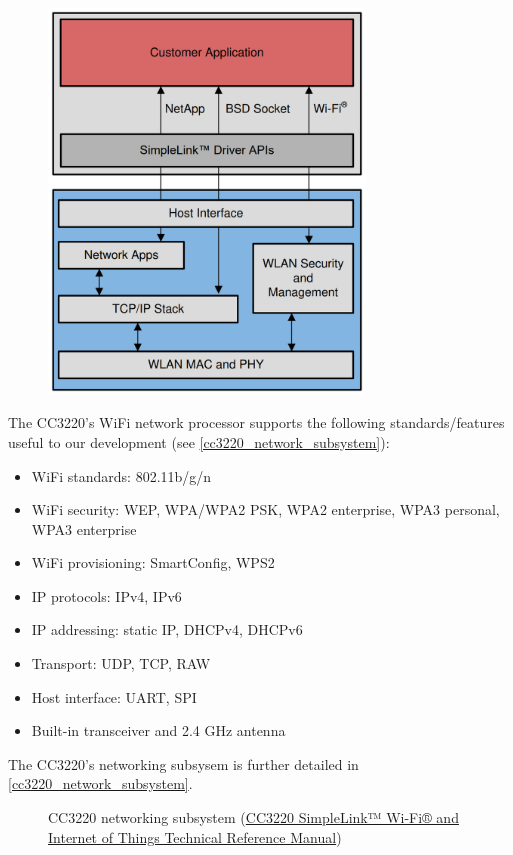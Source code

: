 \begin{flushleft}
\begin{figure}[H]
        \includegraphics[width=0.75\textwidth]{images/cc3220_sw_overview.png}
    \end{figure}
    The CC3220's WiFi network processor supports the following
    standards/features useful to our development
    (see \autoref{cc3220_network_subsystem}):
    \begin{itemize}
        \item WiFi standards: 802.11b/g/n
        \item WiFi security: WEP, WPA/WPA2 PSK, WPA2 enterprise, WPA3 personal,
        WPA3 enterprise
        \item WiFi provisioning: SmartConfig, WPS2
        \item IP protocols: IPv4, IPv6
        \item IP addressing: static IP, DHCPv4, DHCPv6
        \item Transport: UDP, TCP, RAW
        \item Host interface: UART, SPI
        \item Built-in transceiver and 2.4 GHz antenna
    \end{itemize}
    The CC3220's networking subsysem is further detailed in
    \autoref{cc3220_network_subsystem}.
    \begin{figure}[H]
        \caption{CC3220 networking subsystem (\href{https://www.ti.com/lit/ug/swru455m/swru455m.pdf}{CC3220 SimpleLink™ Wi-Fi® and Internet of Things Technical Reference Manual})}

\end{figure}
\end{flushleft}
